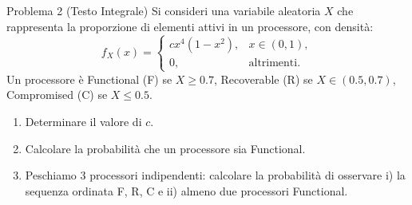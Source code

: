 \documentclass[11pt,a4paper]{article}
\begin{document}
\begin{problemabox}{Problema 2 (Testo Integrale)}
Si consideri una variabile aleatoria $X$ che rappresenta la proporzione di elementi attivi in un processore, con densità:
\[
f_X(x) = \begin{cases}
c x^4 (1 - x^2), & x \in (0, 1), \\
0, & \text{altrimenti.}
\end{cases}
\]
Un processore è Functional (F) se $X \ge 0.7$, Recoverable (R) se $X \in (0.5, 0.7)$, Compromised (C) se $X \le 0.5$.
\begin{enumerate}[label=(\alph*)]
    \item Determinare il valore di $c$.
    \item Calcolare la probabilità che un processore sia Functional.
    \item Peschiamo 3 processori indipendenti: calcolare la probabilità di osservare i) la sequenza ordinata F, R, C e ii) almeno due processori Functional.
\end{enumerate}
\end{problemabox}
\end{document}
